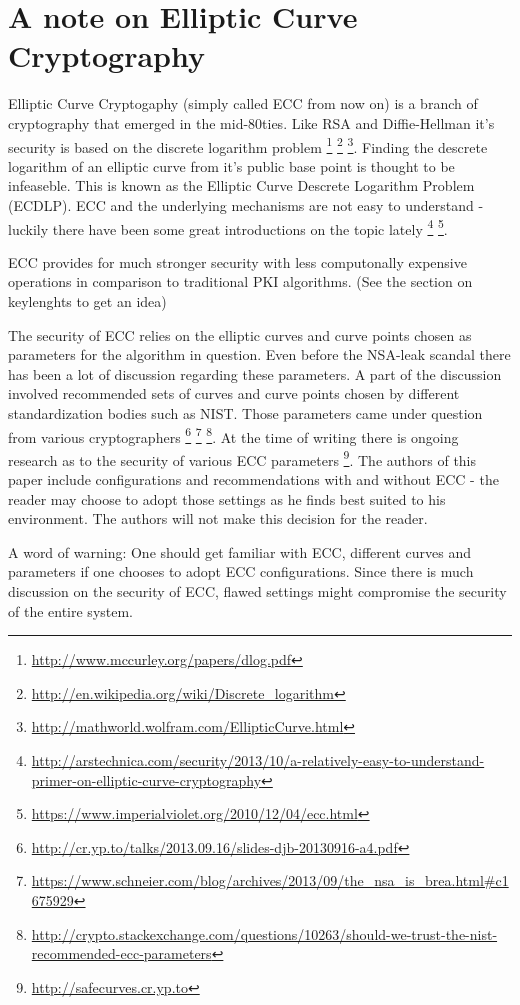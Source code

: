 \section{A note on Elliptic Curve Cryptography}

Elliptic Curve Cryptogaphy (simply called ECC from now on) is a branch of 
cryptography that emerged in the mid-80ties. Like RSA and Diffie-Hellman 
it's security is based on the discrete logarithm problem
\footnote{\url{http://www.mccurley.org/papers/dlog.pdf}} 
\footnote{\url{http://en.wikipedia.org/wiki/Discrete\_logarithm}}
\footnote{\url{http://mathworld.wolfram.com/EllipticCurve.html}}.
Finding the descrete logarithm of an elliptic curve from it's public base
point is thought to be infeaseble. This is known as the Elliptic Curve Descrete 
Logarithm Problem (ECDLP). ECC and the underlying mechanisms are not easy 
to understand - luckily there have been some great introductions on the topic lately
\footnote{\url{http://arstechnica.com/security/2013/10/a-relatively-easy-to-understand-primer-on-elliptic-curve-cryptography}}
\footnote{\url{https://www.imperialviolet.org/2010/12/04/ecc.html}}.

ECC provides for much stronger security with less computonally expensive
operations in comparison to traditional PKI algorithms. (See the section 
on keylenghts to get an idea)

The security of ECC relies on the elliptic curves and curve points chosen
as parameters for the algorithm in question. Even before the NSA-leak scandal
there has been a lot of discussion regarding these parameters. A part of the
discussion involved recommended sets of curves and curve points chosen by
different standardization bodies such as NIST. Those parameters came under
question from various cryptographers
\footnote{\url{http://cr.yp.to/talks/2013.09.16/slides-djb-20130916-a4.pdf}}
\footnote{\url{https://www.schneier.com/blog/archives/2013/09/the\_nsa\_is\_brea.html\#c1675929}}
\footnote{\url{http://crypto.stackexchange.com/questions/10263/should-we-trust-the-nist-recommended-ecc-parameters}}.
At the time of writing there is ongoing research as to the security of 
various ECC parameters
\footnote{\url{http://safecurves.cr.yp.to}}.
The authors of this paper include configurations and recommendations
with and without ECC - the reader may choose to adopt those settings
as he finds best suited to his environment. The authors will not make
this decision for the reader.

A word of warning: One should get familiar with ECC, different curves and
parameters if one chooses to adopt ECC configurations. Since there is much 
discussion on the security of ECC, flawed settings might compromise the 
security of the entire system. %


